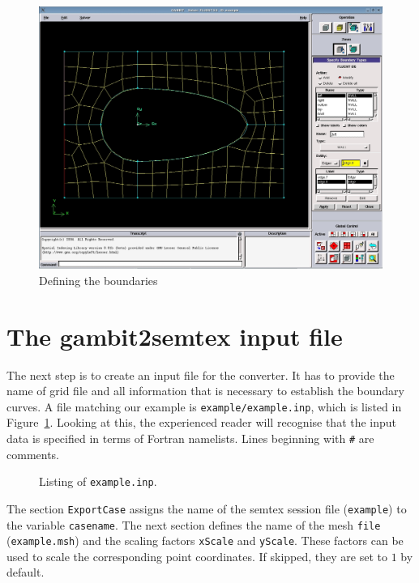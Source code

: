 \documentclass{article}
\begin{document}
\begin{figure}[th]
\centering
\includegraphics[width=\textwidth]{example01.jpg}
\caption{Defining the boundaries}
\end{figure}

\section{The gambit2semtex input file}

The next step is to create an input file for the converter.
It has to provide the name of grid file and all information 
that is necessary to establish the boundary curves. 
A file matching our example is \verb|example/example.inp|,
which is listed in Figure~\ref{fig:example.inp}.
Looking at this, the experienced reader will recognise that the input data 
is specified in terms of Fortran namelists. 
Lines beginning with \texttt{\#} are comments.

\begin{figure}[th]
\centering

\caption{Listing of \texttt{example.inp}.\label{fig:example.inp}}
\end{figure}

The section \texttt{ExportCase} assigns the name of the semtex session
file (\texttt{example}) to the variable \texttt{casename}.
The next section defines the name of the mesh \texttt{file} (\texttt{example.msh}) and the scaling factors \texttt{xScale} and
\texttt{yScale}. These factors can be used to scale the corresponding
point coordinates. If skipped, they are set to $1$ by default. 
\end{document}
